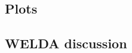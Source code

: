 \documentclass[
        a4paper,
        titlepage,
        twoside,
        parskip,
        numbers=noenddot
        ]{scrbook}
\theoremstyle{break}
\begin{document}



\clearpage
\printbibliography

\begin{appendices}
\chapter{Plots}
  \section{WELDA discussion}

\end{appendices}
\end{document}
